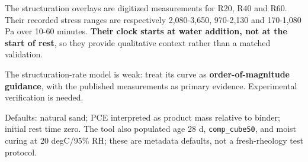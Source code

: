 \begin{agentbox}
\par
The structuration overlays are digitized measurements for R20, R40 and R60. Their recorded stress ranges are respectively 2,080-3,650, 970-2,130 and 170-1,080 Pa over 10-60 minutes. \textbf{Their clock starts at water addition, not at the start of rest}, so they provide qualitative context rather than a matched validation.\par
\par
The structuration-rate model is weak: treat its curve as \textbf{order-of-magnitude guidance}, with the published measurements as primary evidence. Experimental verification is needed.\par
\par
Defaults: natural sand; PCE interpreted as product mass relative to binder; initial rest time zero. The tool also populated age 28 d, \texttt{comp\_cube50}, and moist curing at 20  degC/95\% RH; these are metadata defaults, not a fresh-rheology test protocol.\par
\par
\end{agentbox}